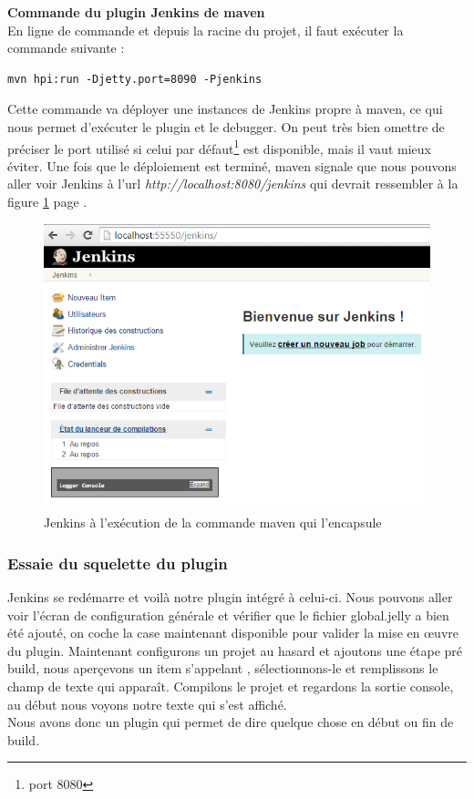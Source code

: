 \textbf{Commande du plugin Jenkins de maven}\hfill \\ \indent 
En ligne de commande et depuis la racine du projet, il faut exécuter la commande suivante :
\begin{lstlisting}
mvn hpi:run -Djetty.port=8090 -Pjenkins
\end{lstlisting}
Cette commande va déployer une instances de Jenkins propre à maven, ce qui nous permet d'exécuter le plugin et le debugger. On peut très bien omettre de préciser le port utilisé si celui par défaut\footnote{port 8080} est disponible, mais il vaut mieux éviter. Une fois que le déploiement est terminé, maven signale que  nous pouvons aller voir Jenkins à l'url \emph{http://localhost:8080/jenkins} qui devrait ressembler à la figure \ref{figure:firstJenkinsWhenGenerateTheSkeletonPlugin} page \pageref{figure:firstJenkinsWhenGenerateTheSkeletonPlugin}.
\begin{figure}[!h]
  \centering
      \includegraphics[width=\textwidth]{images/firstJenkinsWhenGenerateTheSkeletonPlugin.png}
  \caption{Jenkins à l'exécution de la commande maven qui l'encapsule}
	\label{figure:firstJenkinsWhenGenerateTheSkeletonPlugin}
\end{figure}



\subsubsection{Essaie du squelette du plugin}
Jenkins se redémarre et voilà notre plugin intégré à celui-ci. Nous pouvons aller voir l'écran de configuration générale et vérifier que le fichier global.jelly a bien été ajouté, on coche la case maintenant disponible pour valider la mise en \oe{}uvre du plugin. Maintenant configurons un projet au hasard et ajoutons une étape pré build, nous aperçevons un item s'appelant , sélectionnons-le et remplissons le champ de texte qui appara\^{i}t. Compilons le projet et regardons la sortie console, au début nous voyons notre texte qui s'est affiché.\\
Nous avons donc un plugin qui permet de dire quelque chose en début ou fin de build. 



